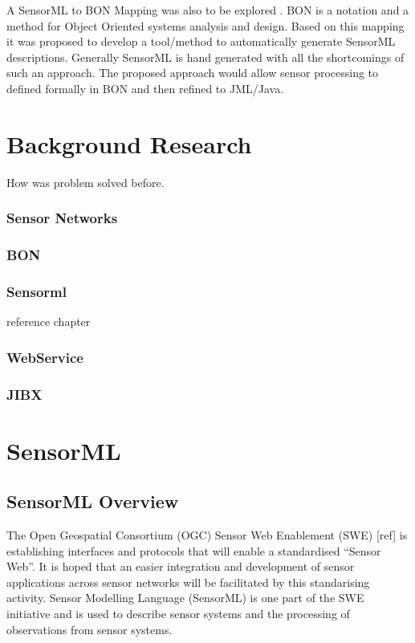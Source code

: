 \documentclass[]{final_report}
\begin{document}
A  SensorML to BON Mapping was also to be explored . BON\cite{BONref} is a notation and a method for Object Oriented systems analysis and design. Based on this mapping it was proposed to develop a tool/method to automatically generate SensorML descriptions. Generally SensorML is hand generated with all the shortcomings of such an approach. The proposed approach would allow sensor processing to defined formally in BON and then refined to JML/Java. 


\chapter{ Background Research}

How was problem solved before.

\subsection{Sensor Networks}
\subsection{BON}
\subsection{Sensorml}
reference chapter
\subsection{WebService}
\subsection{JIBX}

\chapter{SensorML}
\section{SensorML Overview}
The Open Geospatial Consortium (OGC) Sensor Web Enablement (SWE) [ref]  is establishing interfaces and protocols that will enable a standardised “Sensor Web”. It is hoped that an easier integration and development of sensor applications across sensor networks will be facilitated by this standarising activity. Sensor Modelling Language (SensorML) is one part of the SWE initiative and is used to describe sensor systems and the processing of observations from sensor systems.
\end{document}
